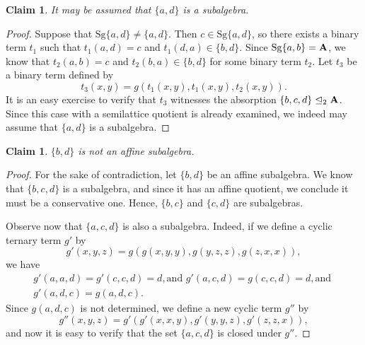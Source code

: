 \documentclass[11pt]{amsart}
\newcommand{\m}[1]{\mathbf{\uppercase{#1}}}
\theoremstyle{definition}
\theoremstyle{remark}
\theoremstyle{plain}
\newtheorem{claim}[thm]{Claim}
\begin{document}
\begin{enumerate}[wide, labelindent=0pt]
\begin{claim}\label{Cl63}
It may be assumed that $\{a,d\}$ is a subalgebra.
\end{claim}
\begin{proof}
Suppose that $\mathrm{Sg}\{a,d\}\neq \{a,d\}$. Then $c\in\mathrm{Sg}\{a,d\}$, so there exists a binary term $t_1$ such that $t_1(a,d)=c$ and $t_1(d,a)\in \{b,d\}$. Since $\mathrm{Sg}\{a,b\}=\m a$, we know that $t_2(a,b)=c$ and $t_2(b,a)\in\{b,d\}$ for some binary term $t_2$. Let $t_3$ be a binary term defined by $$t_3(x,y)=g(t_1(x,y),t_1(x,y),t_2(x,y)).$$ It is an easy exercise to verify that $t_3$ witnesses the absorption $\{b,c,d\}\trianglelefteq_2\m a$. Since this case with a semilattice quotient is already examined, we indeed may assume that $\{a,d\}$ is a subalgebra.
\end{proof}

\begin{claim}
$\{b,d\}$ is not an affine subalgebra.
\end{claim}
\begin{proof}
For the sake of contradiction, let $\{b,d\}$ be an affine subalgebra. We know that $\{b,c,d\}$ is a subalgebra, and since it has an affine quotient, we conclude it must be a conservative one. Hence, $\{b,c\}$ and $\{c,d\}$ are subalgebras. 

Observe now that $\{a,c,d\}$ is also a subalgebra. Indeed, if we define a cyclic ternary term $g'$ by $$g'(x,y,z)=g(g(x,y,y),g(y,z,z),g(z,x,x)),$$ we have
$$
\begin{gathered}
g'(a,a,d)=g'(c,c,d)=d, \text{and  } g'(a,c,d)=g(c,c,d)=d, \text{and  }\\
g'(a,d,c)=g(a,d,c).
\end{gathered}
$$
Since $g(a,d,c)$ is not determined, we define a new cyclic term $g''$ by $$g''(x,y,z)=g'(g'(x,x,y),g'(y,y,z),g'(z,z,x)),$$
and now it is easy to verify that the set $\{a,c,d\}$ is closed under $g''$.


\end{proof}
\end{enumerate}
\end{document}
